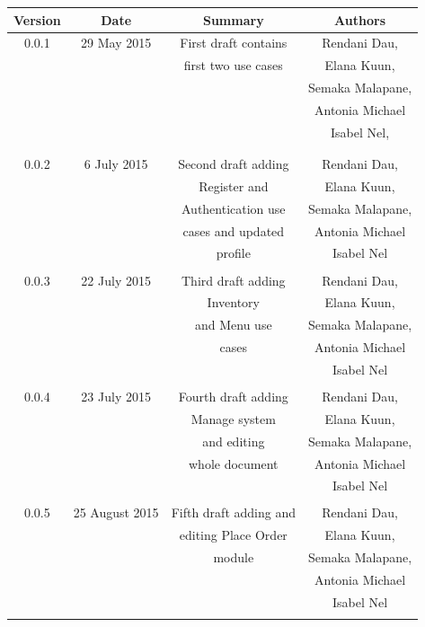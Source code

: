 \documentclass[a4paper,12pt]{report}
\begin{document}
\begin{table}[h!]
\centering
 \begin{tabular}{||c c c c||} 
 \hline
 \textbf{Version} & \textbf{Date} & \textbf{Summary} & \textbf{Authors} \\ [0.5ex] 
 \hline\hline
 0.0.1 & 29 May 2015 &  First draft contains  & Rendani Dau, \\ & & first two use cases & Elana Kuun, \\ & & & Semaka Malapane, \\ & & & Antonia Michael \\ & & & Isabel Nel, \\ & & & \\
 \hline 
 & & & \\
 0.0.2 & 6 July 2015 &  Second draft adding & Rendani Dau, \\ & & Register and & Elana Kuun, \\ & & Authentication use & Semaka Malapane, \\ & & cases and updated &  Antonia Michael \\ & & profile & Isabel Nel \\   [1ex] 
 \hline
& & & \\
 0.0.3 & 22 July 2015 &  Third draft adding & Rendani Dau, \\ & & Inventory & Elana Kuun, \\ & & and Menu use & Semaka Malapane, \\ & & cases &  Antonia Michael \\ & & & Isabel Nel \\   [1ex] 
 \hline
& & & \\
 0.0.4 & 23 July 2015 &  Fourth draft adding & Rendani Dau, \\ & & Manage system & Elana Kuun, \\ & & and editing & Semaka Malapane, \\ & & whole document &  Antonia Michael \\ & & & Isabel Nel \\   [1ex] 
 \hline
& & & \\
 0.0.5 & 25 August 2015 &  Fifth draft adding and & Rendani Dau, \\ & & editing Place Order  & Elana Kuun, \\ & & module  & Semaka Malapane, \\ & & &  Antonia Michael \\ & & & Isabel Nel \\   [1ex] 
\hline
& & & \\

\end{tabular}
\end{table}
\end{document}
